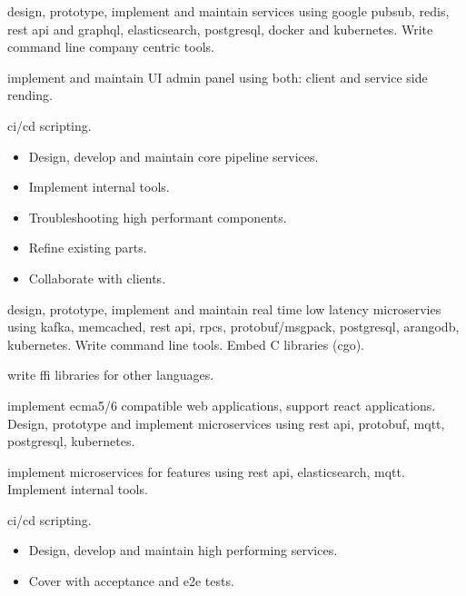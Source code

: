 \documentclass[10pt,a4paper,ragged2e,withhyper]{altacv}
\begin{document}

 design, prototype, implement and maintain services using google
pubsub, redis, rest api and graphql, elasticsearch, postgresql, docker and
kubernetes. Write command line company centric tools.

 implement and maintain UI
admin panel using both: client and service side rending.

 ci/cd scripting.

\divider

\begin{itemize}
\item Design, develop and maintain core pipeline services.
\item Implement internal tools.
\item Troubleshooting high performant components.
\item Refine existing parts.
\item Collaborate with clients.
\end{itemize}


 design, prototype, implement and maintain real time low latency
microservies using kafka, memcached, rest api, rpcs, protobuf/msgpack,
postgresql, arangodb, kubernetes. Write command line tools. Embed C libraries
(cgo).

 write ffi libraries for other languages.

 implement ecma5/6 compatible web applications, support react
applications. Design, prototype and implement microservices using rest api,
protobuf, mqtt, postgresql, kubernetes.

 implement microservices for features using rest api, elasticsearch,
mqtt. Implement internal tools.

 ci/cd scripting.

\divider

\begin{itemize}
\item Design, develop and maintain high performing services.
\item Cover with acceptance and e2e tests.
\end{itemize}

\end{document}
